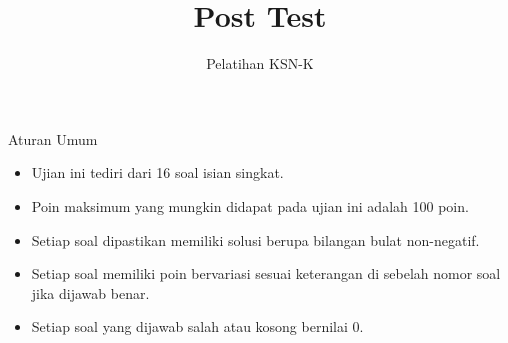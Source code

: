 \documentclass[12pt]{scrartcl}
\begin{document}
	\title{Post Test} %
	\date{}
	\author{Pelatihan KSN-K}
	\maketitle

\renewcommand*\contentsname{Daftar Isi}
\tableofcontents

\newpage
	
	Aturan Umum
	\begin{itemize}
	    \item Ujian ini tediri dari 16 soal isian singkat.
	    \item Poin maksimum yang mungkin didapat pada ujian ini adalah 100 poin.
	    \item Setiap soal dipastikan memiliki solusi berupa bilangan bulat non-negatif.
	    \item Setiap soal memiliki poin bervariasi sesuai keterangan di sebelah nomor soal jika dijawab benar.
	    \item Setiap soal yang dijawab salah atau kosong bernilai 0.
	\end{itemize}
	
\end{document}

